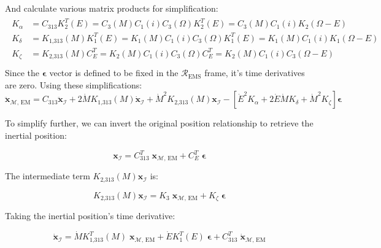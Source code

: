 \documentclass[]{article}
\begin{document}
	And calculate various matrix products for simplification:
	\begin{align*}
	\begin{split}
		K_\alpha &= C_\text{313}K_2^T(E) = C_3(M) C_1(i) C_3(\Omega) K_2^T(E) = C_3(M) C_1(i) K_2(\Omega - E) \\
		K_\delta &= K_\text{1,313}(M)K_1^T(E) = K_1(M) C_1(i) C_3(\Omega) K_1^T(E) = K_1(M) C_1(i) K_1(\Omega - E)  \\
		K_\zeta &= K_\text{2,313}(M) C_E^T = K_2(M) C_1(i) C_3(\Omega) C_E^T = K_2(M) C_1(i) C_3(\Omega - E)  \\
	\end{split}
	\end{align*}
	Since the $\boldsymbol{\epsilon}$ vector is defined to be fixed in the $\mathcal{R}_\text{EMS}$ frame, it's time derivatives are zero.  Using these simplifications:
	\begin{equation}
		\ddot{\mathbf{x}}_{\mathcal{M}\text{, EM}} = C_\text{313} \ddot{\mathbf{x}}_\mathcal{I} + 2 \dot{M} K_\text{1,313}(M) \dot{\mathbf{x}}_\mathcal{I} + \dot{M}^2 K_\text{2,313}(M) \mathbf{x}_\mathcal{I} - \left[ \dot{E}^2 K_\alpha + 2 \dot{E} \dot{M} K_\delta + \dot{M}^2 K_\zeta \right] \boldsymbol{\epsilon} 
	\end{equation}
	
	To simplify further, we can invert the original position relationship to retrieve the inertial position:
	
	\begin{equation}
		\mathbf{x}_\mathcal{I} = C_\text{313}^T \; \mathbf{x}_{\mathcal{M}\text{, EM}} + C_E^T \; \boldsymbol{\epsilon}
	\end{equation}
	
	The intermediate term $K_\text{2,313}(M) \mathbf{x}_\mathcal{I}$ is:
	
	\begin{equation}
		K_\text{2,313}(M) \mathbf{x}_\mathcal{I} = K_3 \; \mathbf{x}_{\mathcal{M}\text{, EM}} + K_\zeta \; \boldsymbol{\epsilon}
	\end{equation}
	
	Taking the inertial position's time derivative:
	
	\begin{equation}
		\dot{\mathbf{x}}_\mathcal{I} = \dot{M} K_\text{1,313}^T(M) \; \mathbf{x}_{\mathcal{M}\text{, EM}} + \dot{E} K_1^T(E) \; \boldsymbol{\epsilon} + C_\text{313}^T \; \dot{\mathbf{x}}_{\mathcal{M}\text{, EM}}
	\end{equation}
	
\end{document}

